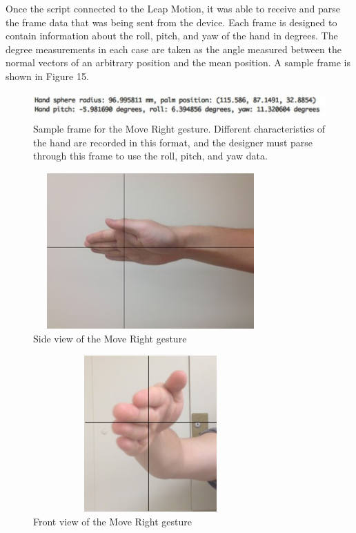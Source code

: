 \documentclass[letterpaper,english, 12pt]{article}
\begin{document}
Once the script connected to the Leap Motion, it was able to receive and parse the frame data that was being sent from the device. Each frame is designed to contain information about the roll, pitch, and yaw of the hand in degrees. The degree measurements in each case are taken as the angle measured between the normal vectors of an arbitrary position and the mean position. A sample frame is shown in Figure 15.

\begin{figure}[t]
	\centering
	\includegraphics[height=1cm,width=130mm]{pics/frameData.jpg}
	\caption{Sample frame for the Move Right gesture. Different characteristics of the hand are recorded in this format, and the designer must parse through this frame to use the roll, pitch, and yaw data.}
\end{figure}

\begin{figure}[t]
	\centering
	\includegraphics[height=6cm,width=90mm]{pics/correspondingHand1.jpg}
	\caption{Side view of the Move Right gesture}
\end{figure}

\begin{figure}[t]
	\centering
	\includegraphics[height=6cm,width=90mm]{pics/correspondingHand2.jpg}
	\caption{Front view of the Move Right gesture}
\end{figure}
\end{document}

